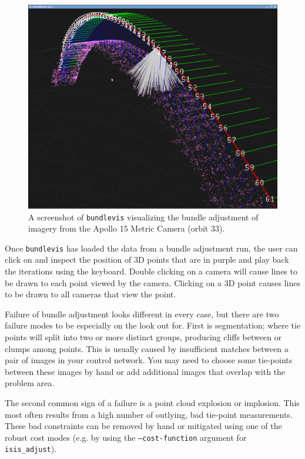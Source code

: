\begin{figure}[t!]
  \begin{center}
  \includegraphics[width=5in]{images/bundlevis_apollo.png}
  \end{center}
  \caption{ A screenshot of \texttt{bundlevis} visualizing the bundle
    adjustment of imagery from the Apollo 15 Metric Camera (orbit
    33). }
  \label{fig:bundlevis}
\end{figure}

Once \texttt{bundlevis} has loaded the data from a bundle adjustment run,
the user can click on and inspect the position of 3D points that are
in purple and play back the iterations using the keyboard. Double
clicking on a camera will cause lines to be drawn to each point viewed
by the camera. Clicking on a 3D point causes lines to be drawn to all
cameras that view the point.

Failure of bundle adjustment looks different in every case, but there
are two failure modes to be especially on the look out for. First is
segmentation; where tie points will split into two or more distinct
groups, producing cliffs between or clumps among points. This is
usually caused by insufficient matches between a
pair of images in your control network.  You may need to choose some
tie-points between these images by hand or add additional images that
overlap with the problem area.

The second common sign of a failure is a point cloud explosion or
implosion. This most often results from a high number of outlying,
bad tie-point measurements. These bad constraints can be removed by
hand or mitigated using one of the robust cost modes (e.g. by using
the \texttt{--cost-function} argument for \texttt{isis\_adjust}).

